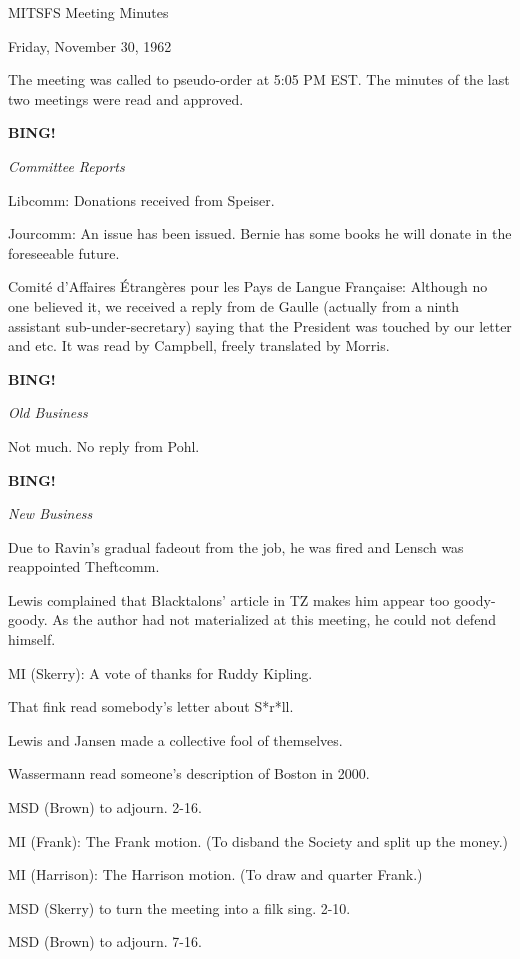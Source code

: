 \documentclass[12pt]{article}
\newcommand{\bing}{{\bf BING!} }
\newcommand{\goto}[1]{\bing \vskip 12pt \centerline{{\em{#1}}}}
\begin{document}
\begin{center}

MITSFS Meeting Minutes

Friday, November 30, 1962

\end{center}
 
\vspace{12pt}

\setlength{\parskip}{6pt}

\noindent
The meeting was called to pseudo-order at 5:05 PM EST. The minutes of the last two meetings were read and approved.

\goto{Committee Reports}

Libcomm: Donations received from Speiser.

Jourcomm: An issue has been issued. Bernie has some books he will donate in the foreseeable future.

Comit\'e d'Affaires \'Etrang\`eres pour les Pays de Langue Fran\c caise: Although no one believed it, we received a reply from de Gaulle (actually from a ninth assistant sub-under-secretary) saying that the President was touched by our letter and etc. It was read by Campbell, freely translated by Morris.

\goto{Old Business}

Not much. No reply from Pohl.

\goto{New Business}

Due to Ravin's gradual fadeout from the job, he was fired and Lensch was reappointed Theftcomm.

Lewis complained that Blacktalons' article in TZ makes him appear too goody-goody. As the author had not materialized at this meeting, he could not defend himself.

MI (Skerry): A vote of thanks for Ruddy Kipling.

That fink read somebody's letter about S*r*ll.

Lewis and Jansen made a collective fool of themselves.

Wassermann read someone's description of Boston in 2000.

MSD (Brown) to adjourn. 2-16.

MI (Frank): The Frank motion. (To disband the Society and split up the money.)

MI (Harrison): The Harrison motion. (To draw and quarter Frank.)

MSD (Skerry) to turn the meeting into a filk sing. 2-10.

MSD (Brown) to adjourn. 7-16.
\end{document}
